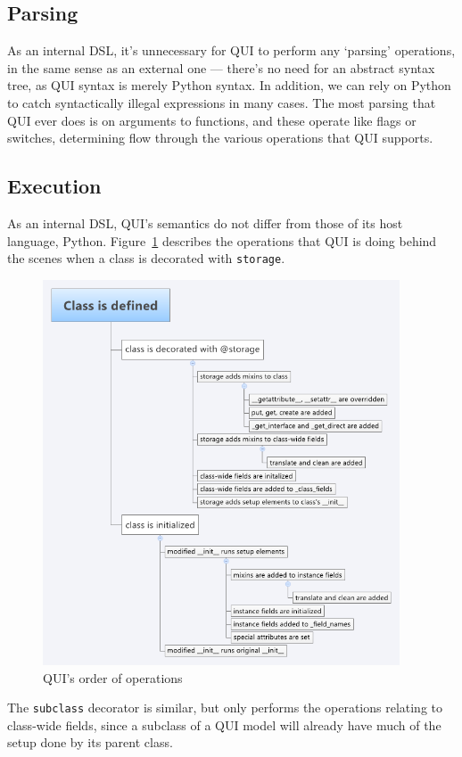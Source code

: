 \documentclass{article} %
\newcommand{\il}[1]{\mbox{\lstinline{#1}}}
\begin{document}
\subsection{Parsing}
As an internal DSL, it's unnecessary for QUI to perform any `parsing' operations, in the same sense as an external one --- there's no need for an abstract syntax tree, as QUI syntax
is merely Python syntax. In addition, we can rely on Python to catch syntactically illegal expressions in many cases. The most parsing that QUI ever does is on arguments to functions,
and these operate like flags or switches, determining flow through the various operations that QUI supports.

\subsection{Execution}
As an internal DSL, QUI's semantics do not differ from those of its host language, Python. Figure~\ref{fig:classdef} describes the operations that QUI is doing behind the scenes when
a class is decorated with \il{storage}.
\begin{figure}[htb]
\centering
\includegraphics[width=400px]{ClassDefTimeline}
\caption{QUI's order of operations}
\label{fig:classdef}
\end{figure}
The \il{subclass} decorator is similar, but only performs the operations relating to class-wide fields, since a subclass of a QUI model will already have much of the setup done by its parent class. 
\end{document}
